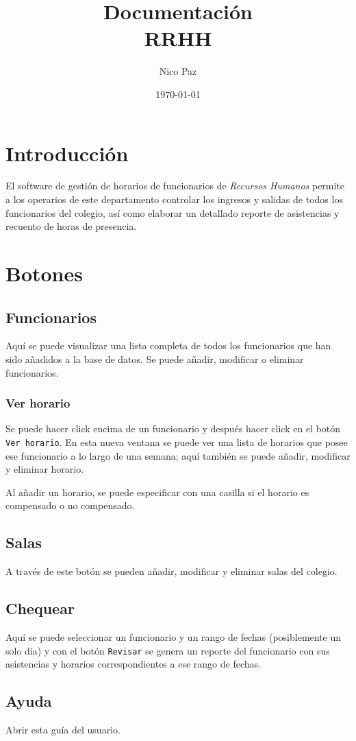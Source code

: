 \documentclass[a4paper]{scrartcl}
\begin{document}
\title{Documentación\\RRHH}
\author{Nico Paz}
\date{\today}
\maketitle
\tableofcontents
\clearpage

\section{Introducción}
El software de gestión de horarios de funcionarios de
\textit{Recursos Humanos} permite a los operarios
de este departamento controlar los ingresos y salidas
de todos los funcionarios del colegio, así como elaborar
un detallado reporte de asistencias y recuento de horas
de presencia.

\clearpage
\section{Botones}
\subsection{Funcionarios}
Aquí se puede visualizar una lista completa de todos los funcionarios que
han sido añadidos a la base de datos. Se puede añadir, modificar o eliminar
funcionarios.
\subsubsection{Ver horario}
Se puede hacer click encima de un funcionario y
después hacer click en el botón \texttt{Ver horario}.
En esta nueva ventana se puede ver una lista de
horarios que posee ese funcionario a lo largo de
una semana; aquí también se puede añadir, modificar
y eliminar horario.

Al añadir un horario, se puede especificar con una casilla
si el horario es compensado o no compensado.

\subsection{Salas}
A través de este botón se pueden añadir, modificar y eliminar salas del
colegio.

\subsection{Chequear}
Aquí se puede seleccionar un funcionario y un rango de fechas
(posiblemente un solo día) y con el botón \texttt{Revisar}
se genera un reporte del funcionario con sus asistencias y
horarios correspondientes a ese rango de fechas.

\begin{comment}
  TODO: Citar las reglas con que se consideran las faltas
  y como se cuentan las horas

\end{comment}

\subsection{Ayuda}
Abrir esta guía del usuario.
\end{document}
